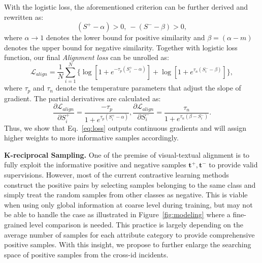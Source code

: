 \documentclass[runningheads]{llncs}
\begin{document}
With the logistic loss, the aforementioned criterion can be further derived and rewritten as:
\begin{equation}
(S^+-\alpha) > 0,\ -( S^- - \beta) > 0,
\label{eq:derivation}
\end{equation}
where $\alpha\rightarrow 1$ denotes the lower bound for positive similarity and $\beta = (\alpha - m)$ denotes the upper bound for negative similarity. Together with logistic loss function, our final \emph{Alignment loss} can be unrolled as: 
\begin{equation}
\mathcal{L}_{align} = \frac{1}{N}\sum_{i=1}^{N}\Big\{ \log\left[1 + e^{-\tau_p(S_{i}^+ - \alpha)}\right] + \log\left[1 + e^{\tau_n(S_i^{-} - \beta)}\right] \Big\},
\label{eq:loss} 
\end{equation}
where $\tau_p$ and $\tau_n$ denote the temperature parameters that adjust the slope of gradient. The partial derivatives are calculated as:
\begin{equation}
\frac{\partial \mathcal{L}_{align}}{\partial S_i^{+}} = \frac{-\tau_p}{1 + e^{\tau_p (S_i^{+} - \alpha)}}, \frac{\partial \mathcal{L}_{align}}{\partial S_i^{-}} = \frac{\tau_n}{1+e^{\tau_n (\beta - S_i^{-})}}.
\label{eq:weight} 
\end{equation}
Thus, we show that Eq.~\ref{eq:loss} outputs continuous gradients and will assign higher weights to more  informative samples accordingly.

\noindent\textbf{K-reciprocal Sampling.}
One of the premise of visual-textual alignment is to fully exploit the informative positive and negative samples $\boldsymbol{t}^+, \boldsymbol{t}^-$ to provide valid supervisions. However, most of the current contrastive learning methods~\cite{wen2016discriminative,zhang2017range} construct the positive pairs by selecting samples belonging to the same class and simply treat the random samples from other classes as negative. This is viable when using only global information at coarse level during training, but may not be able to handle the case as illustrated in Figure~\ref{fig:modeling} where a fine-grained level comparison is needed. This practice is largely depending on the average number of samples for each attribute category to provide comprehensive positive samples. With this insight, we propose to further enlarge the searching space of positive samples from the cross-id incidents.
\end{document}
